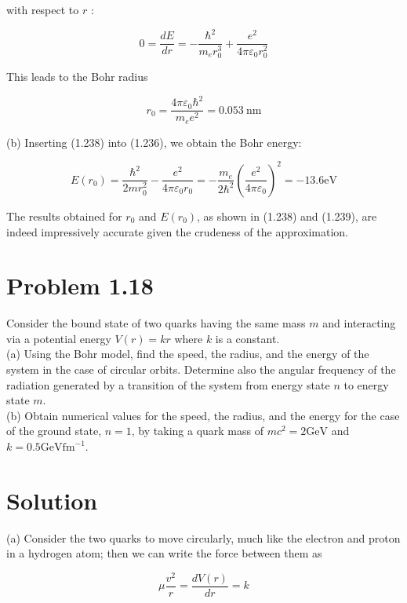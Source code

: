 \documentclass[10pt]{article}
\begin{document}
with respect to $r$ :


\begin{equation*}
0=\frac{d E}{d r}=-\frac{\hbar^{2}}{m_{e} r_{0}^{3}}+\frac{e^{2}}{4 \pi \varepsilon_{0} r_{0}^{2}} \tag{1.237}
\end{equation*}


This leads to the Bohr radius


\begin{equation*}
r_{0}=\frac{4 \pi \varepsilon_{0} \hbar^{2}}{m_{e} e^{2}}=0.053 \mathrm{~nm} \tag{1.238}
\end{equation*}


(b) Inserting (1.238) into (1.236), we obtain the Bohr energy:


\begin{equation*}
E\left(r_{0}\right)=\frac{\hbar^{2}}{2 m r_{0}^{2}}-\frac{e^{2}}{4 \pi \varepsilon_{0} r_{0}}=-\frac{m_{e}}{2 \hbar^{2}}\left(\frac{e^{2}}{4 \pi \varepsilon_{0}}\right)^{2}=-13.6 \mathrm{eV} \tag{1.239}
\end{equation*}


The results obtained for $r_{0}$ and $E\left(r_{0}\right)$, as shown in (1.238) and (1.239), are indeed impressively accurate given the crudeness of the approximation.

\section*{Problem 1.18}
Consider the bound state of two quarks having the same mass $m$ and interacting via a potential energy $V(r)=k r$ where $k$ is a constant.\\
(a) Using the Bohr model, find the speed, the radius, and the energy of the system in the case of circular orbits. Determine also the angular frequency of the radiation generated by a transition of the system from energy state $n$ to energy state $m$.\\
(b) Obtain numerical values for the speed, the radius, and the energy for the case of the ground state, $n=1$, by taking a quark mass of $m c^{2}=2 \mathrm{GeV}$ and $k=0.5 \mathrm{GeV} \mathrm{fm}^{-1}$.

\section*{Solution}
(a) Consider the two quarks to move circularly, much like the electron and proton in a hydrogen atom; then we can write the force between them as


\begin{equation*}
\mu \frac{v^{2}}{r}=\frac{d V(r)}{d r}=k \tag{1.240}
\end{equation*}
\end{document}
